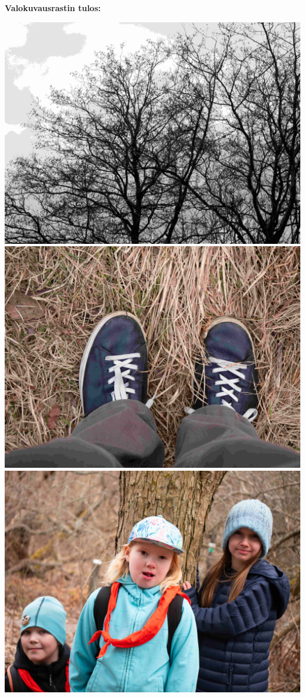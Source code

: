
\clearpage

\textbf{Valokuvausrastin tulos:}

\begin{multicols}{2}

	\centering
	\noindent\includegraphics[width=0.9\linewidth]{assets/kolkkienpäiväretki4}
	\noindent\includegraphics[width=0.9\linewidth]{assets/kolkkienpäiväretki5}
	\noindent\includegraphics[width=0.9\linewidth]{assets/kolkkienpäiväretki6}

\end{multicols}
